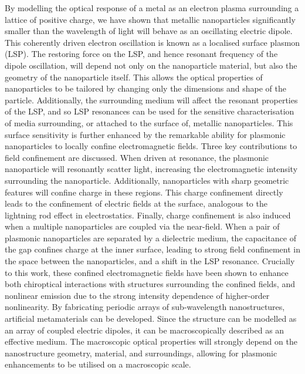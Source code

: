 By modelling the optical response of a metal as an electron plasma surrounding a lattice of positive charge, we have shown that metallic nanoparticles significantly smaller than the wavelength of light will behave as an oscillating electric dipole. This coherently driven electron oscillation is known as a localised surface plasmon (LSP). The restoring force on the LSP, and hence resonant frequency of the dipole oscillation, will depend not only on the nanoparticle material, but also the geometry of the nanoparticle itself. This allows the optical properties of nanoparticles to be tailored by changing only the dimensions and shape of the particle. Additionally, the surrounding medium will affect the resonant properties of the LSP, and so LSP resonances can be used for the sensitive characterisation of media surrounding, or attached to the surface of, metallic nanoparticles.
This surface sensitivity is further enhanced by the remarkable ability for plasmonic nanoparticles to locally confine electromagnetic fields. Three key contributions to field confinement are discussed. When driven at resonance, the plasmonic nanoparticle will resonantly scatter light, increasing the electromagnetic intensity surrounding the nanoparticle. Additionally, nanoparticles with sharp geometric features will confine charge in these regions. This charge confinement directly leads to the confinement of electric fields at the surface, analogous to the lightning rod effect in electrostatics. Finally, charge confinement is also induced when a multiple nanoparticles are coupled via the near-field. When a pair of plasmonic nanoparticles are separated by a dielectric medium, the capacitance of the gap confines charge at the inner surface, leading to strong field confinement in the space between the nanoparticles, and a shift in the LSP resonance.
Crucially to this work, these confined electromagnetic fields have been shown to enhance both chiroptical interactions with structures surrounding the confined fields, and nonlinear emission due to the strong intensity dependence of higher-order nonlinearity. 
By fabricating periodic arrays of sub-wavelength nanostructures, artificial metamaterials can be developed. Since the structure can be modelled as an array of coupled electric dipoles, it can be macroscopically described as an effective medium. The macroscopic optical properties will strongly depend on the nanostructure geometry, material, and surroundings, allowing for plasmonic enhancements to be utilised on a macroscopic scale.

